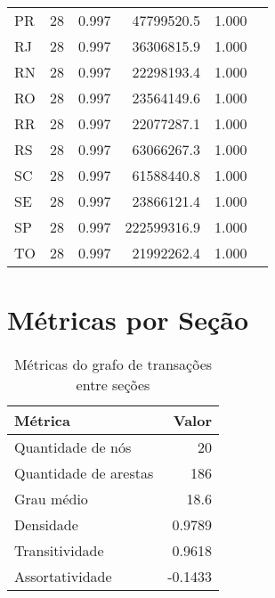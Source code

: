 \begin{table}[htb]
\begin{tabular}{l|rrrrr}
    PR &      28 &      0.997 &          47799520.5 &                1.000 \\
    RJ &      28 &      0.997 &          36306815.9 &                1.000 \\
    RN &      28 &      0.997 &          22298193.4 &                1.000 \\
    RO &      28 &      0.997 &          23564149.6 &                1.000 \\
    RR &      28 &      0.997 &          22077287.1 &                1.000 \\
    RS &      28 &      0.997 &          63066267.3 &                1.000 \\
    SC &      28 &      0.997 &          61588440.8 &                1.000 \\
    SE &      28 &      0.997 &          23866121.4 &                1.000 \\
    SP &      28 &      0.997 &         222599316.9 &                1.000 \\
    TO &      28 &      0.997 &          21992262.4 &                1.000 \\
    \bottomrule
    \end{tabular}
\fdadospesquisa
\end{table}

\section{Métricas por Seção}

\begin{table}[htb]
\centering
\caption{Métricas do grafo de transações entre seções}
\label{tab:metricas-redes:grafo-por-secao}
    \begin{tabular}{l|r}
    \toprule
    Métrica &  Valor \\
    \midrule
    Quantidade de nós &       20      \\
    Quantidade de arestas &  186      \\
    Grau médio &              18.6 \\
    Densidade &           0.9789 \\
    Transitividade &      0.9618 \\
    Assortatividade &    -0.1433 \\
    \bottomrule
    \end{tabular}
\fdadospesquisa
\end{table}

